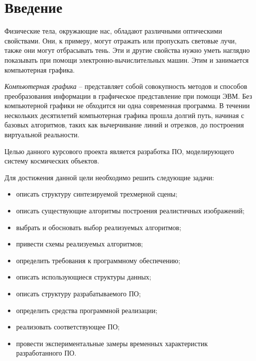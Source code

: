 \chapter*{Введение}

Физические тела, окружающие нас, обладают различными оптическими свойствами. Они, к примеру, могут отражать или пропускать световые лучи, также они могут отбрасывать тень. Эти и другие свойства нужно уметь наглядно показывать при помощи электронно-вычислительных машин.
Этим и занимается компьютерная графика.

\textit{Компьютерная графика} -- представляет собой совокупность методов и способов преобразования информации в графическое представление при помощи ЭВМ.
Без компьютерной графики не обходится ни одна современная программа. В течении нескольких десятилетий компьютерная графика прошла долгий путь, начиная с базовых
алгоритмов, таких как вычерчивание линий и отрезков, до построения виртуальной реальности.

Целью данного курсового проекта является разработка ПО, моделирующего систему космических объектов.

Для достижения данной цели необходимо решить следующие задачи:

\begin{itemize}
    \item описать структуру синтезируемой трехмерной сцены;
    \item описать существующие алгоритмы построения реалистичных изображений;
    \item выбрать и обосновать выбор реализуемых алгоритмов;
    \item привести схемы реализуемых алгоритмов;
    \item определить требования к программному обеспечению;
	\item описать использующиеся структуры данных;
	\item описать структуру разрабатываемого ПО;
	\item определить средства программной реализации;
    \item реализовать соответствующее ПО;
	\item провести экспериментальные замеры временных характеристик разработанного ПО.
\end{itemize}
